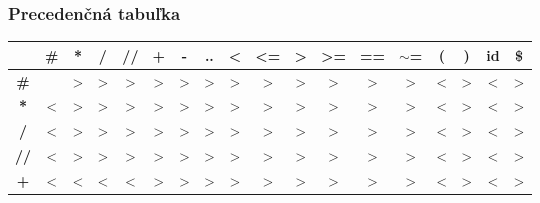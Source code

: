 \documentclass[a4paper, 12pt]{article}
\begin{document}
\subsubsection{Precedenčná tabuľka}
\FloatBarrier
\begin{table}[!ht]
\begin{tabular}{|c|c|c|c|c|c|c|c|c|c|c|c|c|c|c|c|c|c|}
\hline
                         & \textbf{\#}    & \textbf{*}     & \textbf{/}     & \textbf{//}    & \textbf{+}     & \textbf{-}     & \textbf{..}    & \textbf{\textless{}} & \textbf{\textless{}=} & \textbf{\textgreater{}} & \textbf{\textgreater{}=} & \textbf{==}    & \textbf{$\sim$=} & \textbf{(}  & \textbf{)}     & \textbf{id} & \textbf{\$}    \\ \hline
\textbf{\#}              &                & \textgreater{} & \textgreater{} & \textgreater{} & \textgreater{} & \textgreater{} & \textgreater{} & \textgreater{}       & \textgreater{}        & \textgreater{}          & \textgreater{}           & \textgreater{} & \textgreater{}   & \textless{} & \textgreater{} & \textless{} & \textgreater{} \\ \hline
\textbf{*}               & \textless{}    & \textgreater{} & \textgreater{} & \textgreater{} & \textgreater{} & \textgreater{} & \textgreater{} & \textgreater{}       & \textgreater{}        & \textgreater{}          & \textgreater{}           & \textgreater{} & \textgreater{}   & \textless{} & \textgreater{} & \textless{} & \textgreater{} \\ \hline
\textbf{/}               & \textless{}    & \textgreater{} & \textgreater{} & \textgreater{} & \textgreater{} & \textgreater{} & \textgreater{} & \textgreater{}       & \textgreater{}        & \textgreater{}          & \textgreater{}           & \textgreater{} & \textgreater{}   & \textless{} & \textgreater{} & \textless{} & \textgreater{} \\ \hline
\textbf{//}              & \textless{}    & \textgreater{} & \textgreater{} & \textgreater{} & \textgreater{} & \textgreater{} & \textgreater{} & \textgreater{}       & \textgreater{}        & \textgreater{}          & \textgreater{}           & \textgreater{} & \textgreater{}   & \textless{} & \textgreater{} & \textless{} & \textgreater{} \\ \hline
\textbf{+}               & \textless{}    & \textless{}    & \textless{}    & \textless{}    & \textgreater{} & \textgreater{} & \textgreater{} & \textgreater{}       & \textgreater{}        & \textgreater{}          & \textgreater{}           & \textgreater{} & \textgreater{}   & \textless{} & \textgreater{} & \textless{} & \textgreater{} \\ \hline

\end{tabular}
\end{table}
\end{document}
